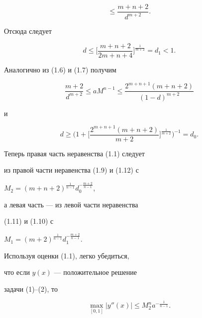 \begin{pf}
\begin{equation}
\le \frac{m+n+2}{d^{m+2}}.


\end{equation}


Отсюда следует


\begin{equation}


d \le \bigg[\frac{m+n+2}{2m+n+4} 


\bigg]^{\frac{1}{m+2}}= d_1 < 1.


\end{equation}


Аналогично из (1.6) и (1.7) получим


\begin{equation}


\frac{m+2}{d^{m+2}} \le aM^{n-1}\le 


\frac{2^{m+n+1}(m+n+2)}{(1-d)^{m+2}}


\end{equation}


и


\begin{equation}


d \ge \bigg(1+\bigg[\frac{2^{m+n+1}(m+n+2)}{m+2}\bigg]^{\frac{1}{m+2}}


\bigg)^{-1}= d_0.


\end{equation}


Теперь правая часть неравенства (1.1) следует


из правой части неравенства (1.9) и (1.12) с


$M_2= (m+n+2)^{\frac{1}{n-1}}d_0^{-\frac{m+2}{n-1}}$, 


а левая часть --- из левой части неравенства 


(1.11) и (1.10) с


$M_1= (m+2)^{\frac{1}{n-1}}d_1^{-\frac{m+2}{n-1}}$.


\end{pf}





Используя оценки (1.1), легко убедиться,


что если $y(x) $ --- положительное решение


задачи (1)--(2), то


\begin{equation}


\max_{[0, 1]} |y''(x)| \le M_2^na^{-\frac{1}{n-1}}.


\end{equation}


